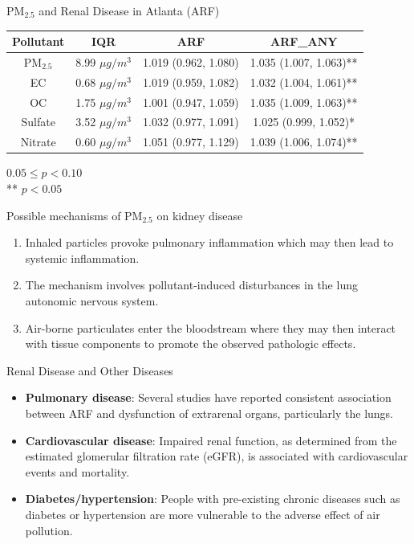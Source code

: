 \documentclass[handout]{beamer} %
\begin{document}
\begin{frame}{PM$_{2.5}$ and Renal Disease in Atlanta (ARF)}
    \begin{table}
        \small
        \centering
        \begin{tabular}{c|c|c|c}
            \hline
            Pollutant & IQR & ARF & ARF\_ANY \\
            \hline
            PM$_{2.5}$ & 8.99 $\mu g/m^3$ & 1.019 (0.962, 1.080) & 1.035 (1.007, 1.063)** \\
            EC & 0.68 $\mu g/m^3$ & 1.019 (0.959, 1.082) & 1.032 (1.004, 1.061)** \\
            OC & 1.75 $\mu g/m^3$ & 1.001 (0.947, 1.059) & 1.035 (1.009, 1.063)** \\
            Sulfate & 3.52 $\mu g/m^3$ & 1.032 (0.977, 1.091) & 1.025 (0.999, 1.052)* \\
            Nitrate & 0.60 $\mu g/m^3$ & 1.051 (0.977, 1.129) & 1.039 (1.006, 1.074)** \\
            \hline
        \end{tabular}
    \end{table}
    {\footnotesize * $0.05 \leq p < 0.10$ \\ ** $p < 0.05$}
\end{frame}

\begin{frame}{Possible mechanisms of PM$_{2.5}$ on kidney disease}
    \begin{enumerate}
        \item Inhaled particles provoke pulmonary inflammation which may then lead to systemic inflammation.
        \item The mechanism involves pollutant-induced disturbances in the lung autonomic nervous system.
        \item Air-borne particulates enter the bloodstream where they may then interact with tissue components to promote the observed pathologic effects. 
    \end{enumerate}
\end{frame}

\begin{frame}{Renal Disease and Other Diseases}
    \begin{itemize}
        \item \textbf{Pulmonary disease}: Several studies have reported consistent association between ARF and dysfunction of extrarenal organs, particularly the lungs.
        \item \textbf{Cardiovascular disease}: Impaired renal function, as determined from the estimated glomerular filtration rate (eGFR), is associated with cardiovascular events and mortality.
        \item \textbf{Diabetes/hypertension}: People with pre-existing chronic diseases such as diabetes or hypertension are more vulnerable to the adverse effect of air pollution.
    \end{itemize}
\end{frame}
\end{document}
